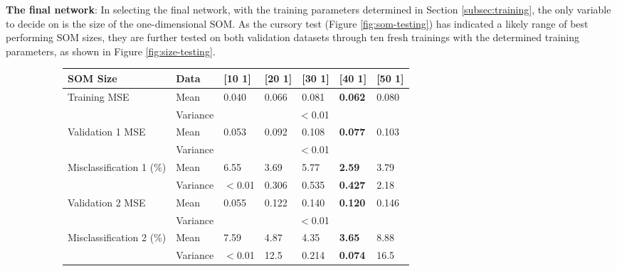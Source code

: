 \documentclass[10pt, oneside]{article}
\begin{document}
\textbf{The final network}: In selecting the final network, with the training parameters determined in Section \ref{subsec:training}, the only variable to decide on is the size of the one-dimensional SOM. As the cursory test (Figure \ref{fig:som-testing}) has indicated a likely range of best performing SOM sizes, they are further tested on both validation datasets through ten fresh trainings with the determined training parameters, as shown in Figure \ref{fig:size-testing}.

\begin{figure}[h]
\begin{subfigure}{0.5\textwidth}
\fontsize{8}{10}\selectfont
\begin{tabular}{|p{2.0cm}|p{1.0cm}|p{0.7cm}|p{0.7cm}|p{0.7cm}|>{\bfseries}p{0.8cm}|p{0.7cm}|}
\hline 
SOM Size & Data & [10 1] & [20 1] & [30 1] & [40 1] & [50 1] \\ \hline
\multirow{2}{*}{\parbox{2.0cm}{\centering Training MSE}} & Mean & 0.040 & 0.066 & 0.081 & 0.062 & 0.080 \\ \cline{2-7}
\ & Variance & \multicolumn{5}{c|}{$<$0.01} \\ \hline
\multirow{2}{*}{\parbox{2.0cm}{\centering Validation 1 MSE}} & Mean & 0.053 & 0.092 & 0.108 & 0.077 & 0.103 \\ \cline{2-7}
\ & Variance & \multicolumn{5}{c|}{$<$0.01} \\ \hline
\multirow{2}{*}{\parbox{2.0cm}{\centering Misclassification 1 (\%)}} & Mean & 6.55 & 3.69 & 5.77 & 2.59 & 3.79 \\ \cline{2-7}
\ & Variance & $<$0.01 & 0.306 & 0.535 & 0.427 & 2.18 \\ \hline
\multirow{2}{*}{\parbox{2.0cm}{\centering Validation 2 MSE}} & Mean & 0.055 & 0.122 & 0.140 & 0.120 & 0.146 \\ \cline{2-7}
\ & Variance & \multicolumn{5}{c|}{$<$0.01} \\ \hline
\multirow{2}{*}{\parbox{2.0cm}{\centering Misclassification 2 (\%)}} & Mean & 7.59 & 4.87 & 4.35 & 3.65 & 8.88 \\ \cline{2-7}
\ & Variance & $<$0.01 & 12.5 & 0.214 & 0.074 & 16.5 \\ \hline
\end{tabular}
\end{subfigure}
\begin{subfigure}{0.5\textwidth}

\end{subfigure}
\end{figure}
\end{document}
